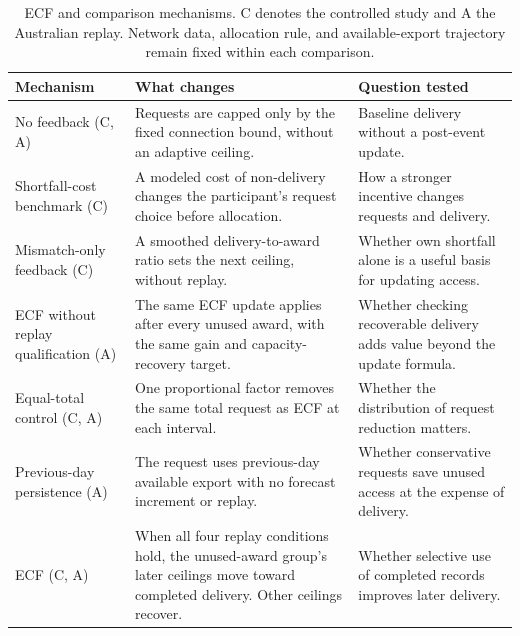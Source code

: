 \documentclass[twoside,twocolumn,9pt]{article}
\begin{document}
\begin{table}[!t]
\centering
\caption{ECF and comparison mechanisms. C denotes the controlled study and A
the Australian replay. Network data, allocation rule, and available-export
trajectory remain fixed within each comparison.}
\label{tab:feedback_controls}
\scriptsize
\setlength{\tabcolsep}{3pt}
\renewcommand{\arraystretch}{1.1}
\begin{tabularx}{\columnwidth}{@{}>{\raggedright\arraybackslash}p{1.65cm}>{\raggedright\arraybackslash}X>{\raggedright\arraybackslash}p{2.05cm}@{}}
\toprule
Mechanism & What changes & Question tested \\
\midrule
No feedback (C, A) & Requests are capped only by the fixed connection bound, without an adaptive ceiling. & Baseline delivery without a post-event update. \\
Shortfall-cost benchmark (C) & A modeled cost of non-delivery changes the participant's request choice before allocation. & How a stronger incentive changes requests and delivery. \\
Mismatch-only feedback (C) & A smoothed delivery-to-award ratio sets the next ceiling, without replay. & Whether own shortfall alone is a useful basis for updating access. \\
ECF without replay qualification (A) & The same ECF update applies after every unused award, with the same gain and capacity-recovery target. & Whether checking recoverable delivery adds value beyond the update formula. \\
Equal-total control (C, A) & One proportional factor removes the same total request as ECF at each interval. & Whether the distribution of request reduction matters. \\
Previous-day persistence (A) & The request uses previous-day available export with no forecast increment or replay. & Whether conservative requests save unused access at the expense of delivery. \\
ECF (C, A) & When all four replay conditions hold, the unused-award group's later ceilings move toward completed delivery. Other ceilings recover. & Whether selective use of completed records improves later delivery. \\
\bottomrule
\end{tabularx}
\end{table}
\end{document}
